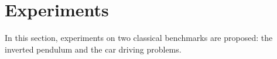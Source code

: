 \documentclass{article}
\begin{document}
%
%
%

\section{Experiments}
\label{exp.sec}
In this section, experiments on two classical benchmarks are
proposed: the inverted pendulum and the car driving problems.
\end{document}
